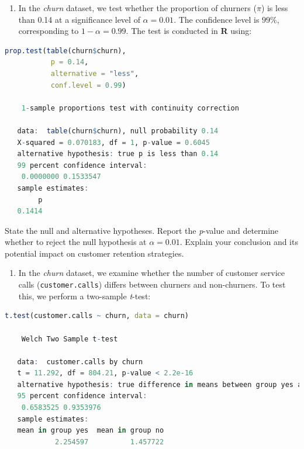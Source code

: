\documentclass[
  11pt,
]{book}
\newcommand{\passthrough}[1]{#1}
\providecommand{\tightlist}{%
  \setlength{\itemsep}{0pt}\setlength{\parskip}{0pt}}
\theoremstyle{definition}
\theoremstyle{definition}
\theoremstyle{definition}
\theoremstyle{definition}
\theoremstyle{remark}
\begin{document}
\begin{enumerate}
\def\labelenumi{\arabic{enumi}.}
\setcounter{enumi}{12}
\tightlist
\item
  In the \emph{churn} dataset, we test whether the proportion of churners (\(\pi\)) is less than 0.14 at a significance level of \(\alpha=0.01\). The confidence level is \(99\%\), corresponding to \(1-\alpha = 0.99\). The test is conducted in \textbf{R} using:
\end{enumerate}

\begin{lstlisting}[language=R]
prop.test(table(churn$churn), 
           p = 0.14, 
           alternative = "less", 
           conf.level = 0.99)
   
    1-sample proportions test with continuity correction
   
   data:  table(churn$churn), null probability 0.14
   X-squared = 0.070183, df = 1, p-value = 0.6045
   alternative hypothesis: true p is less than 0.14
   99 percent confidence interval:
    0.0000000 0.1533547
   sample estimates:
        p 
   0.1414
\end{lstlisting}

State the null and alternative hypotheses. Report the \emph{p}-value and determine whether to reject the null hypothesis at \(\alpha=0.01\). Explain your conclusion and its potential impact on customer retention strategies.

\begin{enumerate}
\def\labelenumi{\arabic{enumi}.}
\setcounter{enumi}{13}
\tightlist
\item
  In the \emph{churn} dataset, we examine whether the number of customer service calls (\passthrough{\lstinline!customer.calls!}) differs between churners and non-churners. To test this, we perform a two-sample \emph{t}-test:
\end{enumerate}

\begin{lstlisting}[language=R]
t.test(customer.calls ~ churn, data = churn)
   
    Welch Two Sample t-test
   
   data:  customer.calls by churn
   t = 11.292, df = 804.21, p-value < 2.2e-16
   alternative hypothesis: true difference in means between group yes and group no is not equal to 0
   95 percent confidence interval:
    0.6583525 0.9353976
   sample estimates:
   mean in group yes  mean in group no 
            2.254597          1.457722
\end{lstlisting}
\end{document}
